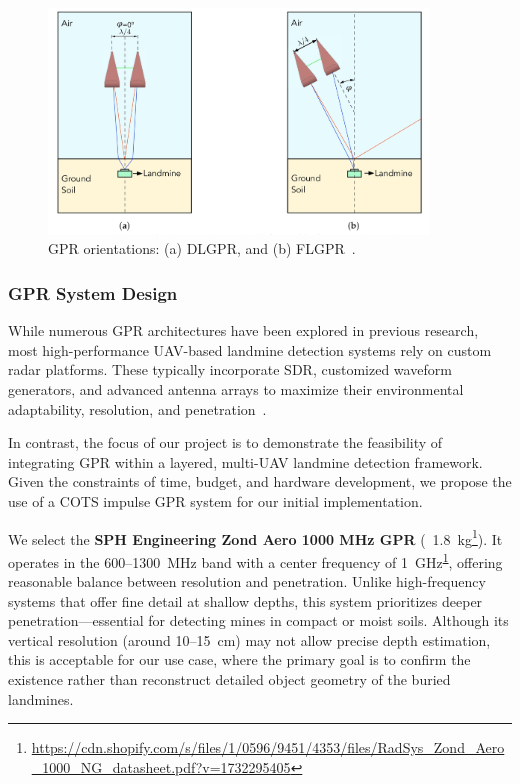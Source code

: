 \begin{figure}[H]
    \centering
    \includegraphics[height=6cm]{figs/Huirui/gpr_ori_modes.png}
    \caption{GPR orientations: (a) DLGPR, and (b) FLGPR~\cite{vsipovs2020lightweight}.}
    \label{fig:GPR_Ori_modes}
\end{figure}



\subsubsection{\gls{GPR} System Design}\label{GPR_design}

While numerous \gls{GPR} architectures have been explored in previous research, most high-performance \gls{UAV}-based landmine detection systems rely on custom radar platforms. These typically incorporate \gls{SDR}, customized waveform generators, and advanced antenna arrays to maximize their environmental adaptability, resolution, and penetration~\cite{cerquera2017uav}.

In contrast, the focus of our project is to demonstrate the feasibility of integrating \gls{GPR} within a layered, multi-\gls{UAV} landmine detection framework. Given the constraints of time, budget, and hardware development, we propose the use of a \gls{COTS} impulse \gls{GPR} system for our initial implementation.

We select the \textbf{SPH Engineering Zond Aero 1000 MHz \gls{GPR}} (~1.8~kg\footnote{\label{Zond}\url{https://cdn.shopify.com/s/files/1/0596/9451/4353/files/RadSys_Zond_Aero_1000_NG_datasheet.pdf?v=1732295405}}). It operates in the 600–1300~MHz band with a center frequency of 1~GHz\textsuperscript{\ref{Zond}}, offering reasonable balance between resolution and penetration. Unlike high-frequency systems that offer fine detail at shallow depths, this system prioritizes deeper penetration—essential for detecting mines in compact or moist soils. Although its vertical resolution (around 10--15~cm) may not allow precise depth estimation, this is acceptable for our use case, where the primary goal is to confirm the existence rather than reconstruct detailed object geometry of the buried landmines.

